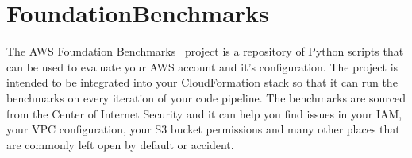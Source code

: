 \section{FoundationBenchmarks}

The AWS Foundation Benchmarks~\cite{hid-sp18-518-FoundationBenchmarks} project
is a repository of Python scripts that can be used to evaluate your AWS
account and it's configuration. The project is intended to be integrated
into your CloudFormation stack so that it can run the benchmarks on every
iteration of your code pipeline. The benchmarks are sourced from the Center
of Internet Security and it can help you find issues in your IAM, your VPC
configuration, your S3 bucket permissions and many other places that are
commonly left open by default or accident.











